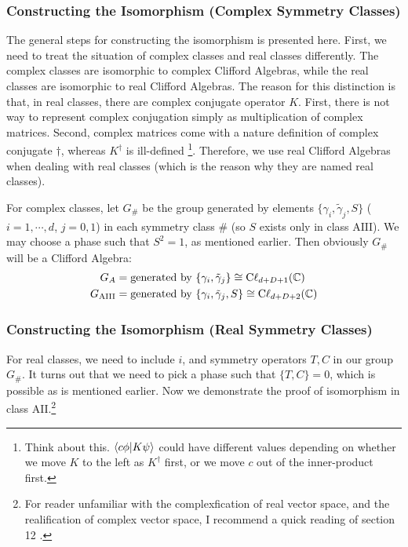 \subsubsection{Constructing the Isomorphism (Complex Symmetry Classes)}
\label{sec:Complex Classes-iso}
The general steps for constructing the isomorphism is presented here. First, we
need to treat the situation of complex classes and real classes
differently. The complex classes are isomorphic to complex Clifford Algebras,
while the real classes are isomorphic to real Clifford Algebras. The reason for
this distinction is that, in real classes, there are complex conjugate operator
$K$. First, there is not way to represent complex conjugation simply as
multiplication of complex matrices. Second, complex matrices come with a nature
definition of complex conjugate $\dagger$, whereas $K^\dagger$ is ill-defined
\footnote{Think about this. $\braket{c \phi |K \psi}$ could have different
    values depending on whether we move $K$ to the left as $K^\dagger$ first, or
we move $c$ out of the inner-product first.}. Therefore, we use real Clifford
Algebras when dealing with real classes (which is the reason why they are named
real classes).

For complex classes, let $G_\#$ be the group generated by elements
$\{\gamma_i,\tilde{\gamma}_j,S\}$ ($i=1,\cdots,d$, $j=0,1$) in each symmetry
class $\#$ (so $S$ exists only in class $\mathrm{AIII}$). We may choose a phase
such that $S^2=1$, as mentioned earlier. Then obviously $G_\#$ will be a
Clifford Algebra:
\begin{align}
    G_{A} &= \text{generated by }\{\gamma_i,\tilde{\gamma}_j\} \cong
    \mathrm{C\ell}_{d+D+1}(\mathbb{C}) \\
    G_{\mathrm{AIII}} &= \text{generated by }\{\gamma_i,\tilde{\gamma}_j,S\}
    \cong  \mathrm{C\ell}_{d+D+2}(\mathbb{C})
\end{align}

\subsubsection{Constructing the Isomorphism (Real Symmetry Classes)}
\label{sec:Real Classes-iso}

For real classes, we need to include $i$, and symmetry operators $T,C$ in our
group $G_\#$. It turns out that we need to pick a phase such that $\{T,C\}=0$,
which is possible as is mentioned earlier. Now we demonstrate the proof of
isomorphism in class $\mathrm{AII}$.\footnote{For reader unfamiliar with the
complexfication of real vector space, and the realification of complex vector
space, I recommend a quick reading of section 12 \cite{suetin1989linear}.}

